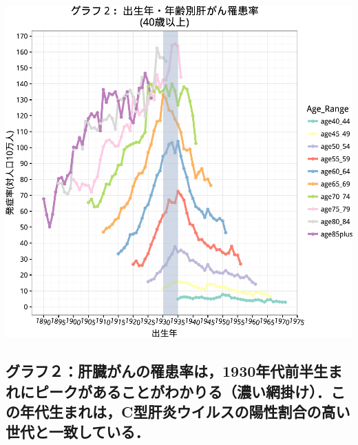 \documentclass[11pt,]{article}
\begin{document}
\includegraphics{example_files/figure-latex/unnamed-chunk-5-1.pdf}

\subsection{グラフ２：肝臓がんの罹患率は，1930年代前半生まれにピークがあることがわかりる（濃い網掛け）．この年代生まれは，C型肝炎ウイルスの陽性割合の高い世代と一致している．}\label{1930c}
\end{document}
